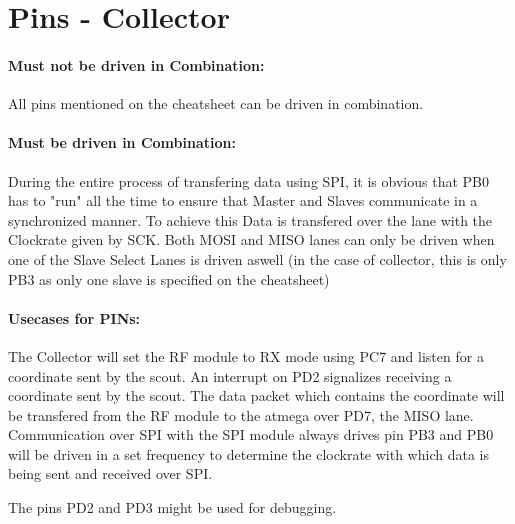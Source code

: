 \documentclass[12pt]{article}
\begin{document}
\vspace{1cm}

\newpage
\section*{Pins - Collector}


\paragraph{Must not be driven in Combination:}
All pins mentioned on the cheatsheet can be driven in combination.

\paragraph{Must be driven in Combination:}
During the entire process of transfering data using SPI, it is obvious that PB0 has to "run" all the time to ensure that Master and Slaves communicate in a  synchronized manner. To achieve this Data is transfered over the lane with the Clockrate given by SCK. Both MOSI and MISO lanes can only be driven when one of the Slave Select Lanes is driven aswell (in the case of collector, this is only PB3 as only one slave is specified on the cheatsheet)

\paragraph{Usecases for PINs:}

The Collector will set the RF module to RX mode using PC7 and listen for a coordinate sent by the scout. An interrupt on PD2 signalizes receiving a coordinate sent by the scout. The data packet which contains the coordinate will be transfered from the RF module to the atmega over PD7, the MISO lane. Communication over SPI with the SPI module always drives pin PB3 and PB0 will be driven in a set frequency to determine the clockrate with which data is being sent and received over SPI.

The pins PD2 and PD3 might be used for debugging.
\end{document}
